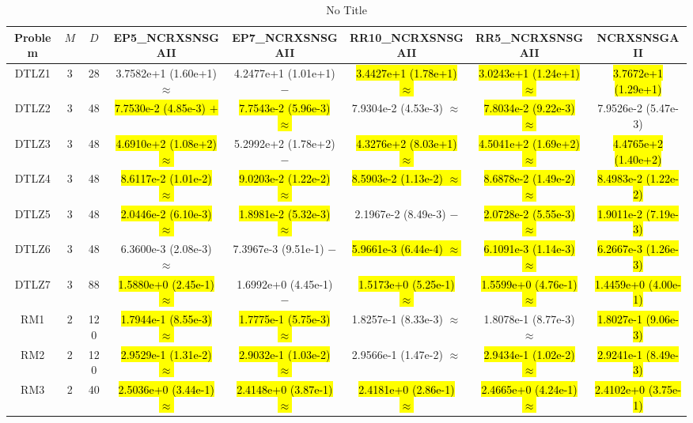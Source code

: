\documentclass[journal]{IEEEtran}
\begin{document}
\begin{table*}[htbp]
\renewcommand{\arraystretch}{1.2}
\centering
\caption{No Title}
\begin{tabular}{cccccccc}
\toprule
Problem&$M$&$D$&EP5\_NCRXSNSGAII&EP7\_NCRXSNSGAII&RR10\_NCRXSNSGAII&RR5\_NCRXSNSGAII&NCRXSNSGAII\\
\midrule
\multirow{1}{*}{DTLZ1}&3&28&3.7582e+1 (1.60e+1) $\approx$&4.2477e+1 (1.01e+1) $-$&\hl{3.4427e+1 (1.78e+1) $\approx$}&\hl{3.0243e+1 (1.24e+1) $\approx$}&\hl{3.7672e+1 (1.29e+1)}\\
\hline
\multirow{1}{*}{DTLZ2}&3&48&\hl{7.7530e-2 (4.85e-3) $+$}&\hl{7.7543e-2 (5.96e-3) $\approx$}&7.9304e-2 (4.53e-3) $\approx$&\hl{7.8034e-2 (9.22e-3) $\approx$}&7.9526e-2 (5.47e-3)\\
\hline
\multirow{1}{*}{DTLZ3}&3&48&\hl{4.6910e+2 (1.08e+2) $\approx$}&5.2992e+2 (1.78e+2) $-$&\hl{4.3276e+2 (8.03e+1) $\approx$}&\hl{4.5041e+2 (1.69e+2) $\approx$}&\hl{4.4765e+2 (1.40e+2)}\\
\hline
\multirow{1}{*}{DTLZ4}&3&48&\hl{8.6117e-2 (1.01e-2) $\approx$}&\hl{9.0203e-2 (1.22e-2) $\approx$}&\hl{8.5903e-2 (1.13e-2) $\approx$}&\hl{8.6878e-2 (1.49e-2) $\approx$}&\hl{8.4983e-2 (1.22e-2)}\\
\hline
\multirow{1}{*}{DTLZ5}&3&48&\hl{2.0446e-2 (6.10e-3) $\approx$}&\hl{1.8981e-2 (5.32e-3) $\approx$}&2.1967e-2 (8.49e-3) $-$&\hl{2.0728e-2 (5.55e-3) $\approx$}&\hl{1.9011e-2 (7.19e-3)}\\
\hline
\multirow{1}{*}{DTLZ6}&3&48&6.3600e-3 (2.08e-3) $\approx$&7.3967e-3 (9.51e-1) $-$&\hl{5.9661e-3 (6.44e-4) $\approx$}&\hl{6.1091e-3 (1.14e-3) $\approx$}&\hl{6.2667e-3 (1.26e-3)}\\
\hline
\multirow{1}{*}{DTLZ7}&3&88&\hl{1.5880e+0 (2.45e-1) $\approx$}&1.6992e+0 (4.45e-1) $-$&\hl{1.5173e+0 (5.25e-1) $\approx$}&\hl{1.5599e+0 (4.76e-1) $\approx$}&\hl{1.4459e+0 (4.00e-1)}\\
\hline
\multirow{1}{*}{RM1}&2&120&\hl{1.7944e-1 (8.55e-3) $\approx$}&\hl{1.7775e-1 (5.75e-3) $\approx$}&1.8257e-1 (8.33e-3) $\approx$&1.8078e-1 (8.77e-3) $\approx$&\hl{1.8027e-1 (9.06e-3)}\\
\hline
\multirow{1}{*}{RM2}&2&120&\hl{2.9529e-1 (1.31e-2) $\approx$}&\hl{2.9032e-1 (1.03e-2) $\approx$}&2.9566e-1 (1.47e-2) $\approx$&\hl{2.9434e-1 (1.02e-2) $\approx$}&\hl{2.9241e-1 (8.49e-3)}\\
\hline
\multirow{1}{*}{RM3}&2&40&\hl{2.5036e+0 (3.44e-1) $\approx$}&\hl{2.4148e+0 (3.87e-1) $\approx$}&\hl{2.4181e+0 (2.86e-1) $\approx$}&\hl{2.4665e+0 (4.24e-1) $\approx$}&\hl{2.4102e+0 (3.75e-1)}\\

\end{tabular}
\end{table*}
\end{document}
